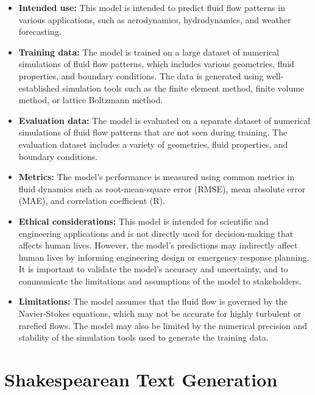 \begin{itemize}
    \item \textbf{Intended use:} This model is intended to predict fluid flow patterns in various applications, such as aerodynamics, hydrodynamics, and weather forecasting.
    \item \textbf{Training data:} The model is trained on a large dataset of numerical simulations of fluid flow patterns, which includes various geometries, fluid properties, and boundary conditions. The data is generated using well-established simulation tools such as the finite element method, finite volume method, or lattice Boltzmann method.
    \item \textbf{Evaluation data:} The model is evaluated on a separate dataset of numerical simulations of fluid flow patterns that are not seen during training. The evaluation dataset includes a variety of geometries, fluid properties, and boundary conditions.
    \item \textbf{Metrics:} The model's performance is measured using common metrics in fluid dynamics such as root-mean-square error (RMSE), mean absolute error (MAE), and correlation coefficient (R).
    \item \textbf{Ethical considerations:} This model is intended for scientific and engineering applications and is not directly used for decision-making that affects human lives. However, the model's predictions may indirectly affect human lives by informing engineering design or emergency response planning. It is important to validate the model's accuracy and uncertainty, and to communicate the limitations and assumptions of the model to stakeholders.
    \item \textbf{Limitations:} The model assumes that the fluid flow is governed by the Navier-Stokes equations, which may not be accurate for highly turbulent or rarefied flows. The model may also be limited by the numerical precision and stability of the simulation tools used to generate the training data.
\end{itemize}

\section{Shakespearean Text Generation } 

